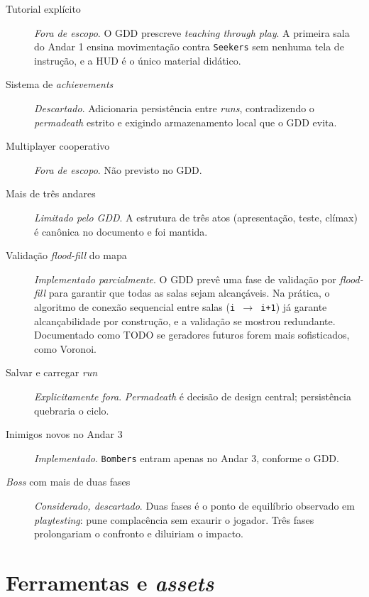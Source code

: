 \begin{description}

  \item[Tutorial explícito] \emph{Fora de escopo}. O GDD prescreve
    \emph{teaching through play}. A primeira sala do Andar 1 ensina movimentação
    contra \texttt{Seekers} sem nenhuma tela de instrução, e a HUD é o único
    material didático.

  \item[Sistema de \emph{achievements}] \emph{Descartado}. Adicionaria persistência
    entre \emph{runs}, contradizendo o \emph{permadeath} estrito e exigindo
    armazenamento local que o GDD evita.

  \item[Multiplayer cooperativo] \emph{Fora de escopo}. Não previsto no GDD.

  \item[Mais de três andares] \emph{Limitado pelo GDD}. A estrutura de três atos
    (apresentação, teste, clímax) é canônica no documento e foi mantida.

  \item[Validação \emph{flood-fill} do mapa] \emph{Implementado parcialmente}. O
    GDD prevê uma fase de validação por \emph{flood-fill} para garantir que todas
    as salas sejam alcançáveis. Na prática, o algoritmo de conexão sequencial entre
    salas (\texttt{i $\to$ i+1}) já garante alcançabilidade por construção, e a
    validação se mostrou redundante. Documentado como TODO se geradores futuros
    forem mais sofisticados, como Voronoi.

  \item[Salvar e carregar \emph{run}] \emph{Explicitamente fora}. \emph{Permadeath}
    é decisão de design central; persistência quebraria o ciclo.

  \item[Inimigos novos no Andar 3] \emph{Implementado}. \texttt{Bombers} entram
    apenas no Andar 3, conforme o GDD.

  \item[\emph{Boss} com mais de duas fases] \emph{Considerado, descartado}. Duas
    fases é o ponto de equilíbrio observado em \emph{playtesting}: pune
    complacência sem exaurir o jogador. Três fases prolongariam o confronto e
    diluiriam o impacto.

\end{description}

\section{Ferramentas e \emph{assets}}

